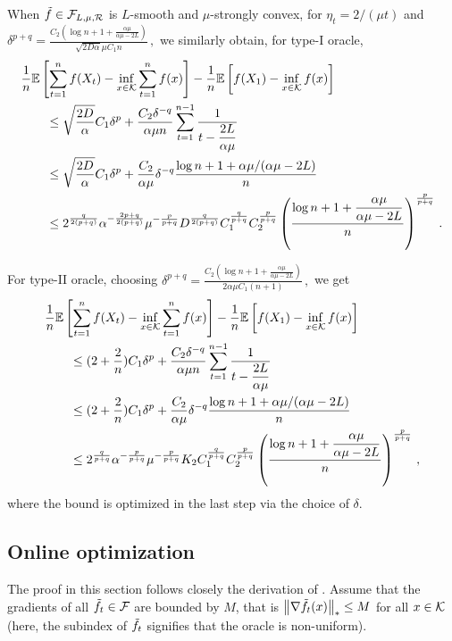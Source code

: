 When $\tilde{f} \in \mathcal{F}_{L,\mu, \mathcal{R}}$ is $L$-smooth and $\mu$-strongly convex, for
$\eta_t = 2/(\mu t)$ and 
$
\delta^{p+q} =  \tfrac{C_2\left( \log n+1+\tfrac{\alpha \mu}{\alpha \mu -2L}\right)}{\sqrt{2D\alpha} \mu C_1 n} \,,
$
we similarly obtain, for type-I oracle, 
 \begin{align*}
 \MoveEqLeft
\frac{1}{n} \EE{ \sum_{t=1}^n f( X_t) - \inf_{x \in \cK} \sum_{t=1}^n f(x)} -\frac{1}{n}\EE{f(X_1)-\inf_{x \in \cK}f(x)}\\
&\le \sqrt{\dfrac{2D}{\alpha}} C_1\delta^p+\dfrac{C_2 \delta^{-q}}{\alpha \mu n} \sum_{t=1}^{n-1}\dfrac{1}{t-\dfrac{2L}{\alpha \mu}}\\
&\le \sqrt{\dfrac{2D}{\alpha}}C_1\delta^p+\dfrac{C_2 }{\alpha \mu}\delta^{-q} \dfrac{\log n+1+\alpha \mu/(\alpha \mu-2L)}{n}\\
&\le 2^{\frac{q}{2(p+q)}}\alpha^{-\frac{2p+q}{2(p+q)}}\mu^{-\frac{p}{p+q}} D^{\frac{q}{2(p+q)}}C_1^{\frac{q}{p+q}}C_2^{\frac{p}{p+q}} \left( \frac{\log n+1+\dfrac{\alpha \mu}{\alpha \mu -2L}}{n} \right)^{\frac{p}{p+q}}\,.
 \end{align*}

For type-II oracle, choosing
$
\delta^{p+q} =  \tfrac{C_2\left( \log n+1+\tfrac{\alpha \mu}{\alpha \mu -2L}\right)}{2\alpha \mu C_1 (n+1)} \,,
$
we get
 \begin{align*}
 \MoveEqLeft
\frac{1}{n} \EE{ \sum_{t=1}^n f( X_t) - \inf_{x \in \cK} \sum_{t=1}^n f(x)} -\frac{1}{n}\EE{f(X_1)-\inf_{x \in \cK}f(x)}\\
&\le (2+\dfrac{2}{n})C_1\delta^p+\dfrac{C_2 \delta^{-q}}{\alpha \mu n} \sum_{t=1}^{n-1}\dfrac{1}{t-\dfrac{2L}{\alpha \mu}}\\
&\le (2+\dfrac{2}{n})C_1\delta^p+\dfrac{C_2 }{\alpha \mu}\delta^{-q} \dfrac{\log n+1+\alpha \mu/(\alpha \mu-2L)}{n}\\
&\le 2^{\frac{q}{p+q}}\alpha^{-\frac{p}{p+q}}\mu^{-\frac{p}{p+q}} K_2C_1^{\frac{q}{p+q}}C_2^{\frac{p}{p+q}} \left( \frac{\log n+1+\dfrac{\alpha \mu}{\alpha \mu -2L}}{n} \right)^{\frac{p}{p+q}}\,,
 \end{align*}
where the bound is optimized in the last step via the choice of $\delta$.



\subsection{Online optimization}
The proof in this section follows closely the derivation of \citet{saha2011improved}.
Assume that the gradients of all $\tilde{f}_t \in \mathcal{F}$ are bounded by $M$, that is $\left\|\nabla \tilde{f}_t(x)\right\|_* \le M$ for all $x \in \mathcal{K}$ (here, the subindex of $\tilde{f}_t$ signifies that the oracle is non-uniform).

